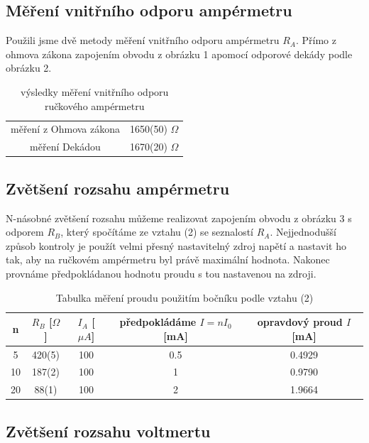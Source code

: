 \documentclass[a4paper,11pt]{article}
\begin{document}
\subsection{Měření vnitřního odporu ampérmetru}

Použili jsme dvě metody měření vnitřního odporu ampérmetru $R_A$. Přímo z ohmova zákona zapojením obvodu z obrázku 1 apomocí odporové dekády podle obrázku 2. 

\begin{table}[htpb]
  \centering
  \begin{tabular}{ c | c }
    měření z Ohmova zákona & 1650(50) $\Omega$ \\
    měření Dekádou & 1670(20) $\Omega$
  \end{tabular}

  \caption{výsledky měření vnitřního odporu ručkového ampérmetru}
\end{table}

\subsection{Zvětšení rozsahu ampérmetru}

N-násobné zvětšení rozsahu můžeme realizovat zapojením obvodu z obrázku 3 s odporem $R_B$, který spočítáme ze 
vztahu (2) se seznalostí $R_A$. Nejjednodušší způsob kontroly je použít velmi přesný 
nastavitelný zdroj napětí a nastavit ho tak, aby na ručkovém ampérmetru byl právě maximální hodnota. 
Nakonec provnáme předpokládanou hodnotu proudu s tou nastavenou na zdroji.

\begin{table}[htpb]
  \centering
  \begin{tabular}{ | c | c | c | c | c | }
    \hline
    n & $R_B$ [$\Omega$] & $I_A$ [$\mu A$] & předpokládáme $I=nI_0$ [mA] & opravdový proud $I$ [mA] \\\hline
    5 & 420(5) & 100 & 0.5 & 0.4929 \\
    10 & 187(2) & 100 & 1 & 0.9790 \\
    20 & 88(1)& 100 & 2 & 1.9664 \\\hline
  \end{tabular}
  \caption{Tabulka měření proudu použitím bočníku podle vztahu (2)}
\end{table}

\subsection{Zvětšení rozsahu voltmertu}
\end{document}
